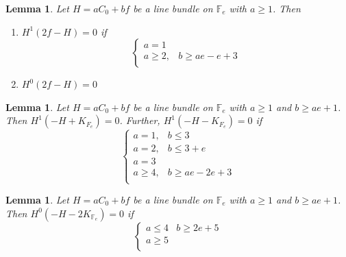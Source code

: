 \documentclass[11pt,twoside]{amsart}
\theoremstyle{plain}
\numberwithin{equation}{section}
\newtheorem{lemma}[theorem]{Lemma}
\theoremstyle{definition}
\begin{document}
\begin{lemma}\label{2f-H}
Let $H = aC_0+bf$ be a line bundle on $\mathbb{F}_e$ with $a \geq 1$. Then 
\begin{enumerate}
    \item[(1)] $H^1(2f-H) = 0$ if 
\[
\begin{cases}
   a = 1 &   \\
   a \geq 2, & b \geq ae-e+3 \\
   
\end{cases}
\]

\item[(2)] $H^0(2f-H) = 0$ 



\end{enumerate}  

\end{lemma}


\begin{lemma}\label{-H-K_Y}
Let $H = aC_0+bf$ be a line bundle on $\mathbb{F}_e$ with $a \geq 1$ and $b \geq ae+1$. Then $H^1(-H+K_{F_e}) = 0$. Further, $H^1(-H-K_{F_e}) = 0$ if 
 \[
\begin{cases}
   a = 1, & b \leq 3  \\
   a = 2, & b \leq 3+e \\
   a = 3 & \\
   a \geq 4, & b \geq ae-2e+3 \\
\end{cases}
 \]

\end{lemma}



\begin{lemma}\label{-H-2K_Y}
Let $H = aC_0+bf$ be a line bundle on $\mathbb{F}_e$ with $a \geq 1$ and $b \geq ae+1$. Then $H^0(-H-2K_{\mathbb{F}_e}) = 0$ if 
\[
\begin{cases}
   a \leq 4 & b \geq 2e+5  \\
   a \geq 5 &   \\
   
\end{cases}
\]
    
\end{lemma}
\end{document}
